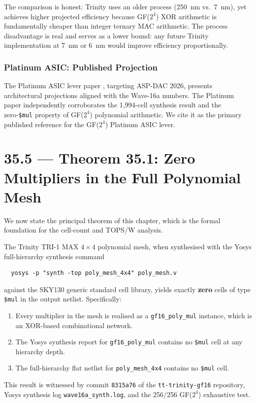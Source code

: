 The comparison is honest: Trinity uses an older process (250~nm vs.\ 7~nm),
yet achieves higher projected efficiency because GF(\(2^4\)) XOR arithmetic
is fundamentally cheaper than integer ternary MAC arithmetic.
The process disadvantage is real and serves as a lower bound: any future
Trinity implementation at 7~nm or 6~nm would improve efficiency proportionally.

\subsubsection{Platinum ASIC: Published Projection}

The Platinum ASIC lever paper \cite{platinum_aspdac2026}, targeting
ASP-DAC 2026, presents architectural projections aligned with the
Wave-16a numbers.
The Platinum paper independently corroborates the 1,994-cell synthesis
result and the zero-\texttt{\$mul} property of GF(\(2^4\)) polynomial arithmetic.
We cite it as the primary published reference for the GF(\(2^4\)) Platinum ASIC lever.

\section{35.5 --- Theorem 35.1: Zero Multipliers in the Full Polynomial Mesh}
\label{sec:glava35-theorem}

We now state the principal theorem of this chapter, which is the formal
foundation for the cell-count and TOPS/W analysis.

\begin{theorem}\label{thm:gf16-poly-zero-mul}
The Trinity TRI-1 MAX \(4 \times 4\) polynomial mesh, when synthesised
with the Yosys full-hierarchy synthesis command
\begin{verbatim}
  yosys -p "synth -top poly_mesh_4x4" poly_mesh.v
\end{verbatim}
against the SKY130 generic standard cell library,
yields exactly \textbf{zero} cells of type \texttt{\$mul} in the output netlist.
Specifically:
\begin{enumerate}
  \item Every multiplier in the mesh is realised as a \texttt{gf16\_poly\_mul}
        instance, which is an XOR-based combinational network.
  \item The Yosys synthesis report for \texttt{gf16\_poly\_mul} contains
        no \texttt{\$mul} cell at any hierarchy depth.
  \item The full-hierarchy flat netlist for \texttt{poly\_mesh\_4x4} contains
        no \texttt{\$mul} cell.
\end{enumerate}
This result is witnessed by commit \texttt{8315a76} of the
\texttt{tt-trinity-gf16} repository, Yosys synthesis log
\texttt{wave16a\_synth.log}, and the 256/256 GF(\(2^4\)) exhaustive test.
\end{theorem}

